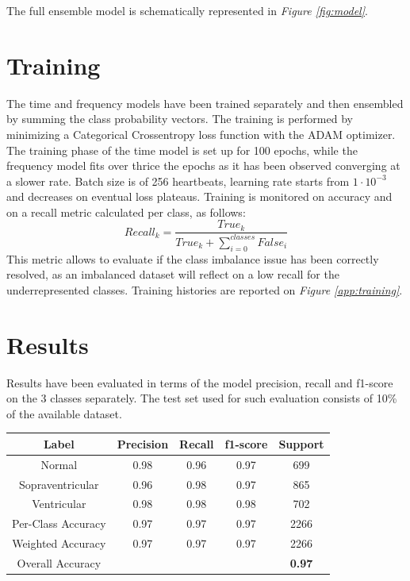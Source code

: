 \documentclass[conference]{IEEEtran}
\newcommand{\fig}[1]{\textit{Figure \ref{#1}}}
\begin{document}
    The full ensemble model is schematically represented in \fig{fig:model}.

\section{Training}
    The time and frequency models have been trained separately and then
    ensembled by summing the class probability vectors. The training is performed by
    minimizing a Categorical Crossentropy loss function with the ADAM optimizer.
    The training phase of
    the time model is set up for 100 epochs, while the frequency model fits over
    thrice the epochs as it has been observed converging at a slower rate. Batch size is
    of 256 heartbeats, learning rate starts from $1\cdot10^{-3}$ and
    decreases on eventual loss plateaus. Training is monitored on accuracy and
    on a recall metric calculated per class, as follows:
    \begin{equation}
        Recall_k=\frac{True_k}{True_k+\sum_{i=0}^{classes}False_i}
    \end{equation}
    This metric allows to evaluate if the class imbalance issue has been
    correctly resolved, as an imbalanced dataset will reflect on a low recall
    for the underrepresented classes.
    Training histories are reported on \fig{app:training}.

\section{Results}
    Results have been evaluated in terms of the model precision, recall and
    f1-score on the 3 classes separately. The test set used for such evaluation
    consists of 10\% of the available dataset.
    
    \begin{center}
        \begin{tabular}{||c|c c c c||}
            \hline
            Label & Precision & Recall & f1-score & Support\\
            \hline \hline
        
            Normal& 0.98&0.96&0.97&699\\
            \hline
            Sopraventricular& 0.96&0.98&0.97&865\\
            \hline
            Ventricular& 0.98&0.98&0.98&702\\
            \hline\hline
        
            Per-Class Accuracy &0.97&0.97&0.97&2266\\
            \hline
            Weighted Accuracy &0.97&0.97&0.97&2266\\
            \hline
            Overall Accuracy&&&&\textbf{0.97}\\
            \hline
        \end{tabular}
    \end{center}
\end{document}
